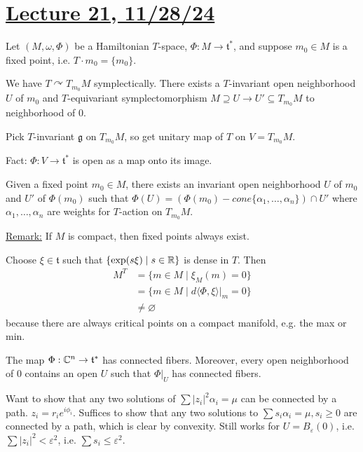 \documentclass[x11names,reqno,14pt]{extarticle}
\newcommand{\mk}[1]{\mathfrak{#1}}
\newcommand{\g}{\mk{g}}
\renewcommand{\t}{\mk{t}}
\begin{document}
\section*{\underline{Lecture 	21, 11/28/24}}

Let $(M,\omega,\Phi)$ be a Hamiltonian $T$-space, $\Phi:M\to\t^*$, and suppose $m_0 \in M$ is a fixed point, i.e. $T \cdot m_0 = \{m_0\}$.

We have $T \curvearrowright T_{m_0}M$ symplectically. There exists a $T$-invariant open neighborhood $U$ of $m_0$ and $T$-equivariant symplectomorphism $M\supseteq U \to U' \subseteq T_{m_0}M$ to neighborhood of 0. 

Pick $T$-invariant $\g$ on $T_{m_0}M$, so get unitary map of $T$ on $V = T_{m_0}M$.

Fact: $\Phi:V\to\t^*$ is open as a map onto its image. 

\prop

Given a fixed point $m_0 \in M$, there exists an invariant open neighborhood $U$ of $m_0$ and $U'$ of $\Phi(m_0)$ such that $\Phi(U) = (\Phi(m_0) - cone\{\alpha_1,\dots,\alpha_n\})\cap U'$ where $\alpha_1,\dots,\alpha_n$ are weights for $T$-action on $T_{m_0}M$. 

\proof

\underline{Remark:} If $M$ is compact, then fixed points always exist. 

Choose $\xi \in \t$ such that $\{\exp(s\xi)\mid s \in \mathbb{R}\}$ is dense in $T$. Then 
\begin{align*}
M^T  & = \{m\in M \mid \xi_M(m) = 0\} \\
& = \{m\in M\mid d\langle\Phi,\xi\rangle|_m = 0\} \\
& \neq \varnothing
\end{align*}
because there are always critical points on a compact manifold, e.g. the max or min.

\lem

The map $\Phi:\C^n\to\t^*$ has connected fibers. Moreover, every open neighborhood of 0 contains an open $U$ such that $\Phi|_U$ has connected fibers.

\proof

Want to show that any two solutions of $\sum|z_i|^2\alpha_i = \mu$ can be connected by a path. $z_i = r_ie^{i\phi_i}$. Suffices to show that any two solutions to $\sum s_i\alpha_i = \mu, s_i \geq 0$ are connected by a path, which is clear by convexity. Still works for $U = B_\varepsilon(0)$, i.e. $\sum |z_i|^2 < \varepsilon^2$, i.e. $\sum s_i \leq \varepsilon^2$.
\end{document}
